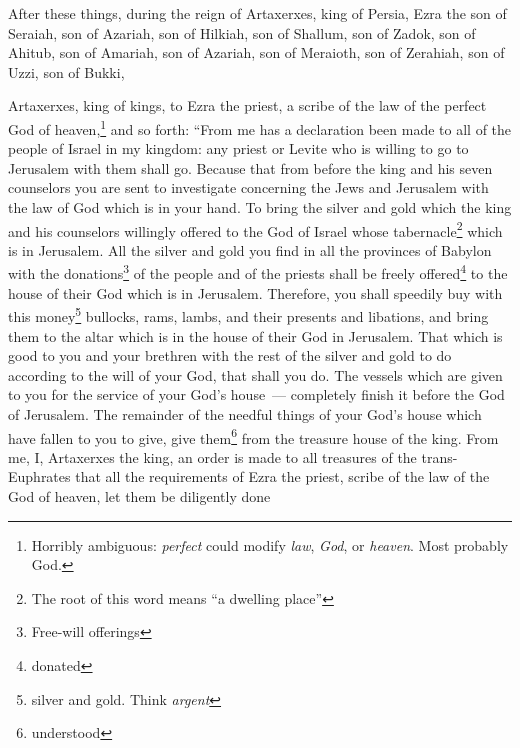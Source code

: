 
\begin{inparaenum}
     After these things, during the reign of Artaxerxes, king of Persia, Ezra the son of Seraiah, son of Azariah, son of Hilkiah,%
     son of Shallum, son of Zadok, son of Ahitub,%
     son of Amariah, son of Azariah, son of Meraioth,%
     son of Zerahiah, son of Uzzi, son of Bukki,%
    
    
    
     Artaxerxes, king of kings, to Ezra the priest, a scribe of the law of the perfect God of heaven,\footnote{Horribly ambiguous: \textit{perfect} could modify \textit{law}, \textit{God}, or \textit{heaven}. Most probably God.} and so forth:%
     ``From me has a declaration been made to all of the people of Israel in my kingdom: any priest or Levite who is willing to go to Jerusalem with them shall go.%
     Because that from before the king and his seven counselors you are sent to investigate concerning the Jews and Jerusalem with the law of God which is in your hand.%
     To bring the silver and gold which the king and his counselors willingly offered to the God of Israel whose tabernacle\footnote{The root of this word means ``a dwelling place''} which is in Jerusalem.%
     All the silver and gold you find in all the provinces of Babylon with the donations\footnote{Free-will offerings} of the people and of the priests shall be freely offered\footnote{donated} to the house of their God which is in Jerusalem.%
     Therefore, you shall speedily buy with this money\footnote{silver and gold. Think \textit{argent}} bullocks, rams, lambs, and their presents and libations, and bring them to the altar which is in the house of their God in Jerusalem.%
     That which is good to you and your brethren with the rest of the silver and gold to do according to the will of your God, that shall you do.%
     The vessels which are given to you for the service of your God's house~--- completely finish it before the God of Jerusalem.%
     The remainder of the needful things of your God's house which have fallen to you to give, give them\footnote{understood} from the treasure house of the king.%
     From me, I, Artaxerxes the king, an order is made to all treasures of the trans-Euphrates that all the requirements of Ezra the priest, scribe of the law of the God of heaven, let them be diligently done%

\end{inparaenum}
